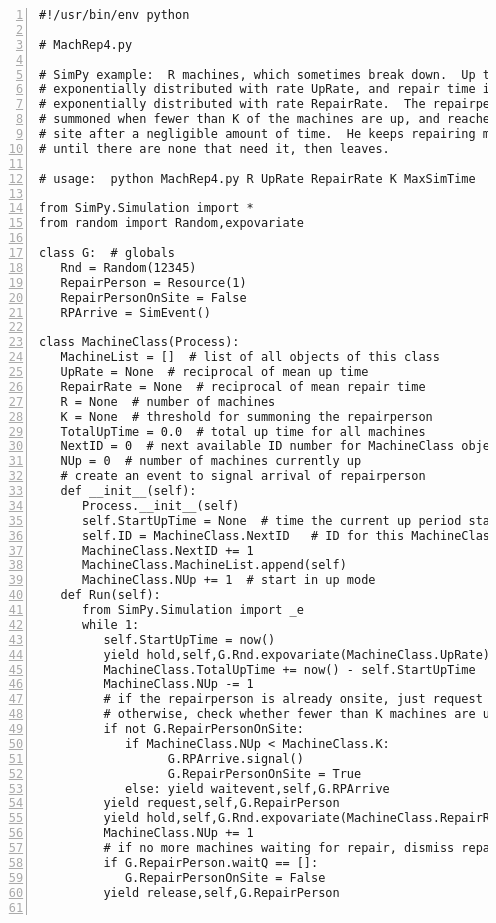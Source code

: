 \documentclass[11pt]{article}
\begin{document}
\begin{Verbatim}[fontsize=\relsize{-2},numbers=left]
#!/usr/bin/env python

# MachRep4.py

# SimPy example:  R machines, which sometimes break down.  Up time is
# exponentially distributed with rate UpRate, and repair time is
# exponentially distributed with rate RepairRate.  The repairperson is
# summoned when fewer than K of the machines are up, and reaches the
# site after a negligible amount of time.  He keeps repairing machines
# until there are none that need it, then leaves.

# usage:  python MachRep4.py R UpRate RepairRate K MaxSimTime

from SimPy.Simulation import *
from random import Random,expovariate

class G:  # globals
   Rnd = Random(12345)
   RepairPerson = Resource(1)
   RepairPersonOnSite = False
   RPArrive = SimEvent()  

class MachineClass(Process):
   MachineList = []  # list of all objects of this class
   UpRate = None  # reciprocal of mean up time
   RepairRate = None  # reciprocal of mean repair time
   R = None  # number of machines
   K = None  # threshold for summoning the repairperson
   TotalUpTime = 0.0  # total up time for all machines
   NextID = 0  # next available ID number for MachineClass objects
   NUp = 0  # number of machines currently up
   # create an event to signal arrival of repairperson
   def __init__(self):
      Process.__init__(self)  
      self.StartUpTime = None  # time the current up period started
      self.ID = MachineClass.NextID   # ID for this MachineClass object
      MachineClass.NextID += 1
      MachineClass.MachineList.append(self)
      MachineClass.NUp += 1  # start in up mode
   def Run(self):
      from SimPy.Simulation import _e
      while 1:
         self.StartUpTime = now()  
         yield hold,self,G.Rnd.expovariate(MachineClass.UpRate)
         MachineClass.TotalUpTime += now() - self.StartUpTime
         MachineClass.NUp -= 1
         # if the repairperson is already onsite, just request him;
         # otherwise, check whether fewer than K machines are up 
         if not G.RepairPersonOnSite:
            if MachineClass.NUp < MachineClass.K: 
                  G.RPArrive.signal()
                  G.RepairPersonOnSite = True
            else: yield waitevent,self,G.RPArrive
         yield request,self,G.RepairPerson
         yield hold,self,G.Rnd.expovariate(MachineClass.RepairRate)
         MachineClass.NUp += 1
         # if no more machines waiting for repair, dismiss repairperson
         if G.RepairPerson.waitQ == []: 
            G.RepairPersonOnSite = False
         yield release,self,G.RepairPerson


\end{Verbatim}
\end{document}
